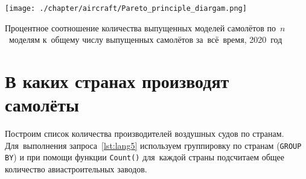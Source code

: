 \begin{marginfigure}[-9\baselineskip]
    \texttt{[image: ./chapter/aircraft/Pareto\_principle\_diargam.png]}%
    \caption[Доля выпущенных моделей самолётов к общему числу самолётов.]
            {Процентное соотношение количества выпущенных моделей самолётов 
             по~$n$~моделям к~общему числу выпущенных самолётов за~всё~время, 2020~год}%
    \label{fig:Pareto_principle_diargam}%
\end{marginfigure}






\newpage 
\label{aircraft_question_4}
\section{В каких странах производят самолёты}

Построим список количества производителей воздушных судов по странам. 
Для~выполнения запроса~\ref{lst:lang5} 
используем группировку по странам (\lstinline|GROUP BY|) 
и при помощи функции \lstinline|Count()| 
для~каждой страны подсчитаем общее количество авиастроительных заводов.


